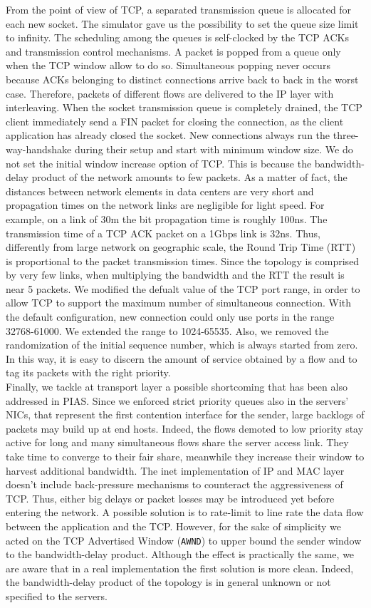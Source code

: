 From the point of view of TCP, a separated transmission queue is allocated for each new socket. The simulator gave us the possibility to set the queue size limit to infinity. The scheduling among the queues is self-clocked by the TCP ACKs and transmission control mechanisms. A packet is popped from a queue only when the TCP window allow to do so. Simultaneous popping never occurs because ACKs belonging to distinct connections arrive back to back in the worst case. Therefore, packets of different flows are delivered to the IP layer with interleaving. When the socket transmission queue is completely drained, the TCP client immediately send a FIN packet for closing the connection, as the client application has already closed the socket. New connections always run the three-way-handshake during their setup and start with minimum window size. We do not set the initial window increase option of TCP. This is because the bandwidth-delay product of the network amounts to few packets. As a matter of fact, the distances between network elements in data centers are very short and propagation times on the network links are negligible for light speed. For example, on a link of 30m the bit propagation time is roughly 100ns. The transmission time of a TCP ACK packet on a 1Gbps link is 32ns. Thus, differently from large network on geographic scale, the Round Trip Time (RTT) is proportional to the packet transmission times. Since the topology is comprised by very few links, when multiplying the bandwidth and the RTT the result is near 5 packets.
We modified the defualt value of the TCP port range, in order to allow TCP to support the maximum number of simultaneous connection. With the default configuration, new connection could only use ports in the range 32768-61000. We extended the range to 1024-65535. Also, we removed the randomization of the initial sequence number, which is always started from zero. In this way, it is easy to discern the amount of service obtained by a flow and to tag its packets with the right priority. \\
Finally, we tackle at transport layer a possible shortcoming that has been also addressed in PIAS. Since we enforced strict priority queues also in the servers' NICs, that represent the first contention interface for the sender, large backlogs of packets may build up at end hosts. Indeed, the flows demoted to low priority stay active for long and many simultaneous flows share the server access link. They take time to converge to their fair share, meanwhile they increase their window to harvest additional bandwidth. The inet implementation of IP and MAC layer doesn't include back-pressure mechanisms to counteract the aggressiveness of TCP. Thus, either big delays or packet losses may be introduced yet before entering the network. A possible solution is to rate-limit to line rate the data flow between the application and the TCP. However, for the sake of simplicity we acted on the TCP Advertised Window (\texttt{AWND}) to upper bound the sender window to the bandwidth-delay product. Although the effect is practically the same, we are aware that in a real implementation the first solution is more clean. Indeed, the bandwidth-delay product of the topology is in general unknown or not specified to the servers. 
